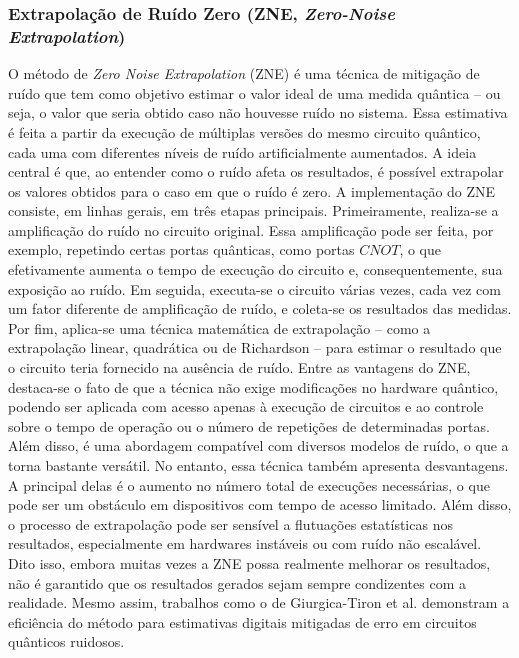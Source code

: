 \subsubsection*{Extrapolaç\~{a}o de Ru\'{i}do Zero (ZNE, \textit{Zero-Noise Extrapolation})}
\label{subSubSec: zne}

O m\'{e}todo de \textit{Zero Noise Extrapolation} (ZNE) \'{e} uma t\'{e}cnica de mitigaç\~{a}o de ru\'{i}do que tem como objetivo estimar o valor ideal de uma medida qu\^{a}ntica -- ou seja, o valor que seria obtido caso n\~{a}o houvesse ru\'{i}do no sistema. Essa estimativa \'{e} feita a partir da execuç\~{a}o de m\'{u}ltiplas vers\~{o}es do mesmo circuito qu\^{a}ntico, cada uma com diferentes n\'{i}veis de ru\'{i}do artificialmente aumentados. A ideia central \'{e} que, ao entender como o ru\'{i}do afeta os resultados, \'{e} poss\'{i}vel extrapolar os valores obtidos para o caso em que o ru\'{i}do \'{e} zero.
A implementaç\~{a}o do ZNE consiste, em linhas gerais, em tr\^{e}s etapas principais. Primeiramente, realiza-se a amplificaç\~{a}o do ru\'{i}do no circuito original. Essa amplificaç\~{a}o pode ser feita, por exemplo, repetindo certas portas qu\^{a}nticas, como portas $CNOT$, o que efetivamente aumenta o tempo de execuç\~{a}o do circuito e, consequentemente, sua exposiç\~{a}o ao ru\'{i}do. Em seguida, executa-se o circuito v\'{a}rias vezes, cada vez com um fator diferente de amplificaç\~{a}o de ru\'{i}do, e coleta-se os resultados das medidas. Por fim, aplica-se uma t\'{e}cnica matem\'{a}tica de extrapolaç\~{a}o -- como a extrapolaç\~{a}o linear, quadr\'{a}tica ou de Richardson -- para estimar o resultado que o circuito teria fornecido na aus\^{e}ncia de ru\'{i}do.
Entre as vantagens do ZNE, destaca-se o fato de que a t\'{e}cnica n\~{a}o exige modificaç\~{o}es no hardware qu\^{a}ntico, podendo ser aplicada com acesso apenas à execuç\~{a}o de circuitos e ao controle sobre o tempo de operaç\~{a}o ou o n\'{u}mero de repetiç\~{o}es de determinadas portas. Al\'{e}m disso, \'{e} uma abordagem compat\'{i}vel com diversos modelos de ru\'{i}do, o que a torna bastante vers\'{a}til. No entanto, essa t\'{e}cnica tamb\'{e}m apresenta desvantagens. A principal delas \'{e} o aumento no n\'{u}mero total de execuç\~{o}es necess\'{a}rias, o que pode ser um obst\'{a}culo em dispositivos com tempo de acesso limitado. Al\'{e}m disso, o processo de extrapolaç\~{a}o pode ser sens\'{i}vel a flutuaç\~{o}es estat\'{i}sticas nos resultados, especialmente em hardwares inst\'{a}veis ou com ru\'{i}do n\~{a}o escal\'{a}vel. Dito isso, embora muitas vezes a ZNE possa realmente melhorar os resultados, n\~{a}o \'{e} garantido que os resultados gerados sejam sempre condizentes com a realidade. Mesmo assim, trabalhos como o de Giurgica-Tiron et al. \citeyear{GiurgicaTiron2020_ZNE} demonstram a efici\^{e}ncia do m\'{e}todo para estimativas digitais mitigadas de erro em circuitos qu\^{a}nticos ruidosos.

